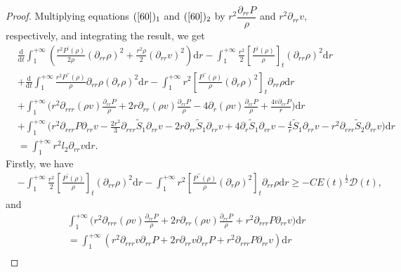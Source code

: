 \documentclass[10pt,reqno]{amsart}
\numberwithin{equation}{section}
\begin{document}
\begin{proof}
		Multiplying equations $(\ref{60})_1$ and $(\ref{60})_2$ 
		by  $r^2\dfrac{\partial_{rr}P}{\rho}$ and $r^2\partial_{rr}v$, respectively, and  integrating the result, we get
		\begin{align}\label{3.66}
				&\frac{\mathrm{d}}{\mathrm{d} t}\int_{1}^{+\infty}\left(\frac{r^2 P^{\prime}(\rho)}{2\rho} \left(\partial_{rr} \rho\right)^2+\frac{r^2\rho}{2} (\partial_{rr}v)^2\right)\mathrm{d}r
				-\int_{1}^{+\infty}\frac{r^2}{2}[\frac{P^{\prime}(\rho)}{\rho}]_t\left(\partial_{rr} \rho\right)^2\mathrm{d}r \nonumber\\
				&+\frac{\mathrm{d}}{\mathrm{d} t}\int_{1}^{+\infty}\frac{r^2 P^{\prime\prime}(\rho)}{\rho} \partial_{rr} \rho(\partial_{r}\rho)^2\mathrm{d}r -\int_{1}^{+\infty}r^2[\frac{P^{\prime\prime}(\rho)}{\rho}(\partial_r\rho)^2]_t\partial_{rr}\rho\mathrm{d}r \nonumber\\
				&+\int_{1}^{+\infty}\bigg(r^2\partial_{rrr}\left(\rho v\right)  \frac{\partial_{rr}P}{\rho}+2r \partial_{rr} (\rho v) \frac{\partial_{rr}P}{\rho} 
				-4\partial_{r} (\rho v) \frac{\partial_{rr}P}{\rho}+\frac{4 v\partial_{rr}P}{r}\bigg)\mathrm{d}r \nonumber\\
				&+\int_{1}^{+\infty}\bigg(
				r^2 \partial_{rrr}P \partial_{rr}v-\frac{2 r^2}{3} \partial_{rrr}\tilde{S}_1 \partial_{rr}v-2r\partial_{rr}\tilde{S}_1\partial_{rr}v+4\partial_{r}\tilde{S}_1  \partial_{rr}v-\frac{4}{r}\tilde{S}_1\partial_{rr}v
				-r^2 \partial_{rrr}\tilde{S}_2\partial_{rr}v\bigg)\mathrm{d}r \nonumber\\
				&=\int_{1}^{+\infty}r^2l_2 \partial_{rr}v\mathrm{d}r.
		\end{align}
		Firstly, we have
		\begin{equation}\nonumber
			\begin{aligned}
				&-\int_{1}^{+\infty}\frac{r^2}{2}[\frac{P^{\prime}(\rho)}{\rho}]_t\left(\partial_{rr} \rho\right)^2\mathrm{d}r -\int_{1}^{+\infty}r^2[\frac{P^{\prime\prime}(\rho)}{\rho}(\partial_r\rho)^2]_t\partial_{rr}\rho\mathrm{d}r
				\geq -C E(t)^{\frac{1}{2}}\mathcal{D}(t),
			\end{aligned}
		\end{equation}
		and
		\begin{equation}\nonumber
			\begin{aligned}
				&\int_{1}^{+\infty}\bigg(r^2\partial_{rrr}\left(\rho v\right)  \frac{\partial_{rr}P}{\rho}+2r \partial_{rr} (\rho v) \frac{\partial_{rr}P}{\rho}+r^2 \partial_{rrr}P \partial_{rr}v 
				\bigg)\mathrm{d}r\\
				&=\int_{1}^{+\infty}(r^2 \partial_{rrr}v\partial_{rr}P+2r \partial_{rr}v\partial_{rr}P+r^2 \partial_{rrr}P \partial_{rr}v)\mathrm{d}r\\

\end{aligned}
\end{equation}
\end{proof}
\end{document}
